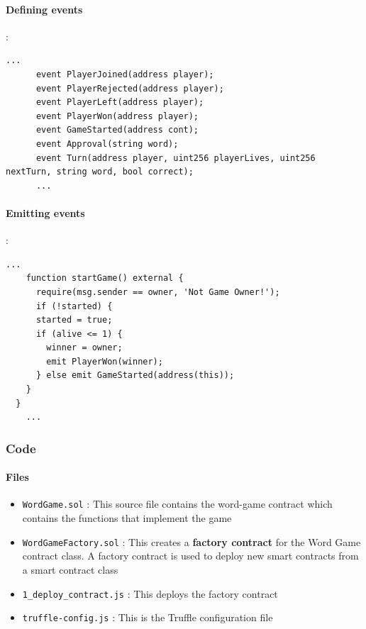 \documentclass{article}
\begin{document}
\paragraph{Defining events}:
\begin{lstlisting}[language=Solidity]
      ...
      event PlayerJoined(address player);
      event PlayerRejected(address player);
      event PlayerLeft(address player);
      event PlayerWon(address player);
      event GameStarted(address cont);
      event Approval(string word);
      event Turn(address player, uint256 playerLives, uint256 nextTurn, string word, bool correct);
      ...
\end{lstlisting}

\paragraph{Emitting events}:
  \begin{lstlisting}[language=Solidity]
    ...
    function startGame() external {
      require(msg.sender == owner, 'Not Game Owner!');
      if (!started) {
      started = true;
      if (alive <= 1) {
        winner = owner;
        emit PlayerWon(winner);
      } else emit GameStarted(address(this));
    }
  }
    ...
\end{lstlisting}







\subsubsection{Code}


\paragraph{Files}

\begin{itemize}
    \item \verb|WordGame.sol| : This source file contains the word-game contract which contains the functions that implement the game 
    \item \verb|WordGameFactory.sol| : This creates a \textbf{factory contract} for the Word Game contract class. A factory contract is used to deploy new smart contracts from a smart contract class
    \item \verb|1_deploy_contract.js| : This deploys the factory contract
    \item \verb|truffle-config.js| : This is the Truffle configuration file
\end{itemize}
\end{document}
